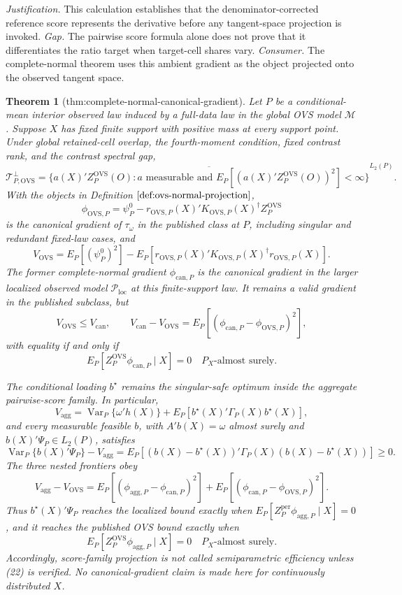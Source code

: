 \documentclass{article}
\newtheorem{theorem}{Theorem}
\begin{document}
\par\smallskip\noindent \textit{Justification.} This calculation establishes that the denominator-corrected reference score represents the derivative before any tangent-space projection is invoked. \textit{Gap.} The pairwise score formula alone does not prove that it differentiates the ratio target when target-cell shares vary. \textit{Consumer.} The complete-normal theorem uses this ambient gradient as the object projected onto the observed tangent space.

\begin{theorem}[thm:complete-normal-canonical-gradient]\label{thm:complete-normal-canonical-gradient}
Let \(P\) be a conditional-mean interior observed law induced by a full-data law in the global OVS model \(\mathcal M\).  Suppose \(X\) has fixed finite support with positive mass at every support point.  Under global retained-cell overlap, the fourth-moment condition, fixed contrast rank, and the contrast spectral gap,
\[
\mathcal T_{P,\mathrm{OVS}}^\perp
=\overline{\{a(X)'Z_P^{\mathrm{OVS}}(O):a\text{ measurable and }
E_P[(a(X)'Z_P^{\mathrm{OVS}}(O))^2]<\infty\}}^{L_2(P)}.
\]
With the objects in Definition \(\ref{def:ovs-normal-projection}\),
\[
\phi_{\mathrm{OVS},P}
=\psi_P^0-r_{\mathrm{OVS},P}(X)'K_{\mathrm{OVS},P}(X)^\dagger
Z_P^{\mathrm{OVS}}
\tag{15}
\]
is the canonical gradient of \(\tau_\omega\) in the published class at \(P\), including singular and redundant fixed-law cases, and
\[
V_{\mathrm{OVS}}
=E_P[(\psi_P^0)^2]
-E_P[r_{\mathrm{OVS},P}(X)'K_{\mathrm{OVS},P}(X)^\dagger r_{\mathrm{OVS},P}(X)].
\tag{16}
\]
The former complete-normal gradient \(\phi_{\mathrm{can},P}\) is the canonical gradient in the larger localized observed model \(\mathcal P_{\mathrm{loc}}\) at this finite-support law.  It remains a valid gradient in the published subclass, but
\[
V_{\mathrm{OVS}}\le V_{\mathrm{can}},
\qquad
V_{\mathrm{can}}-V_{\mathrm{OVS}}
=E_P[(\phi_{\mathrm{can},P}-\phi_{\mathrm{OVS},P})^2],
\tag{17}
\]
with equality if and only if
\[
E_P[Z_P^{\mathrm{OVS}}\phi_{\mathrm{can},P}\mid X]=0
\quad P_X\text{-almost surely}.
\tag{18}
\]

The conditional loading \(b^\star\) remains the singular-safe optimum inside the aggregate pairwise-score family.  In particular,
\[
V_{\mathrm{agg}}
=\operatorname{Var}_P\{\omega'h(X)\}
+E_P[b^\star(X)'\Gamma_P(X)b^\star(X)],
\tag{19}
\]
and every measurable feasible \(b\), with \(A'b(X)=\omega\) almost surely and \(b(X)'\Psi_P\in L_2(P)\), satisfies
\[
\operatorname{Var}_P\{b(X)'\Psi_P\}-V_{\mathrm{agg}}
=E_P[(b(X)-b^\star(X))'\Gamma_P(X)(b(X)-b^\star(X))]\ge0.
\tag{20}
\]
The three nested frontiers obey
\[
V_{\mathrm{agg}}-V_{\mathrm{OVS}}
=E_P[(\phi_{\mathrm{agg},P}-\phi_{\mathrm{can},P})^2]
+E_P[(\phi_{\mathrm{can},P}-\phi_{\mathrm{OVS},P})^2].
\tag{21}
\]
Thus \(b^\star(X)'\Psi_P\) reaches the localized bound exactly when \(E_P[Z_P^{\mathrm{per}}\phi_{\mathrm{agg},P}\mid X]=0\), and it reaches the published OVS bound exactly when
\[
E_P[Z_P^{\mathrm{OVS}}\phi_{\mathrm{agg},P}\mid X]=0
\quad P_X\text{-almost surely}.
\tag{22}
\]
Accordingly, score-family projection is not called semiparametric efficiency unless (22) is verified.  No canonical-gradient claim is made here for continuously distributed \(X\).
\end{theorem}
\end{document}
